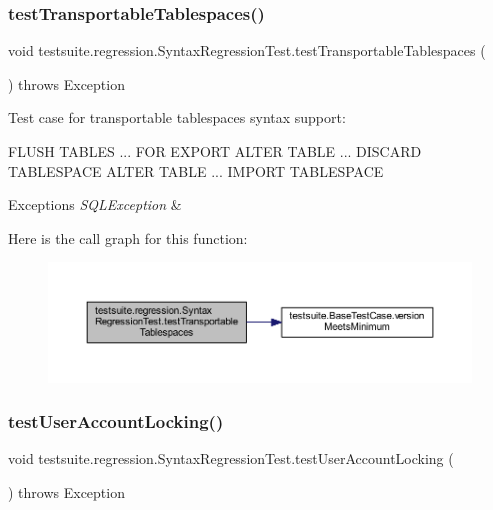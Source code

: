 \subsubsection{\texorpdfstring{test\+Transportable\+Tablespaces()}{testTransportableTablespaces()}}
{\footnotesize\ttfamily void testsuite.\+regression.\+Syntax\+Regression\+Test.\+test\+Transportable\+Tablespaces (\begin{DoxyParamCaption}{ }\end{DoxyParamCaption}) throws Exception}

Test case for transportable tablespaces syntax support\+:

F\+L\+U\+SH T\+A\+B\+L\+ES ... F\+OR E\+X\+P\+O\+RT A\+L\+T\+ER T\+A\+B\+LE ... D\+I\+S\+C\+A\+RD T\+A\+B\+L\+E\+S\+P\+A\+CE A\+L\+T\+ER T\+A\+B\+LE ... I\+M\+P\+O\+RT T\+A\+B\+L\+E\+S\+P\+A\+CE


\begin{DoxyExceptions}{Exceptions}
{\em S\+Q\+L\+Exception} & \\
\hline
\end{DoxyExceptions}
Here is the call graph for this function\+:
\nopagebreak
\begin{figure}[H]
\begin{center}
\leavevmode
\includegraphics[width=350pt]{classtestsuite_1_1regression_1_1_syntax_regression_test_a947576b5790653a73ac1cf0185c76fdd_cgraph}
\end{center}
\end{figure}
\mbox{\label{classtestsuite_1_1regression_1_1_syntax_regression_test_a3da9a690faaf10c2046b6ba25f7a092a}} 
\subsubsection{\texorpdfstring{test\+User\+Account\+Locking()}{testUserAccountLocking()}}
{\footnotesize\ttfamily void testsuite.\+regression.\+Syntax\+Regression\+Test.\+test\+User\+Account\+Locking (\begin{DoxyParamCaption}{ }\end{DoxyParamCaption}) throws Exception}

